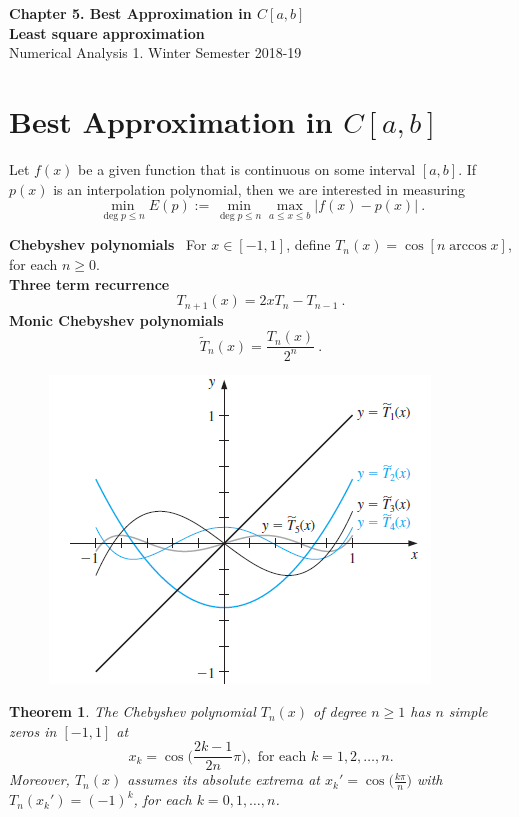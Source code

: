 \documentclass[12pt]{article}
\newtheorem{thm}{Theorem}
\theoremstyle{theorem}
\begin{document}

\thispagestyle{empty}

\begin{center}
	{\LARGE \bf Chapter 5. Best Approximation in $C[a,b]$ \\ Least square approximation}\\[.2cm]
	{\large Numerical Analysis 1. Winter Semester 2018-19}
\end{center}

\section{Best Approximation in $C[a,b]$}

Let $f(x)$ be a given function that is continuous on some interval $[a,b]$. If $p(x)$ is an interpolation polynomial, then we are interested in measuring 
%
\[  
\min_{\deg p\leq n} E(p) := \min_{\deg p\leq n} \max_{a\leq x\leq b} |f(x)-p(x)| \ .
\]
%
\begin{shaded}
\textbf{Chebyshev polynomials} \ For $x \in [-1,1]$, define $T_n(x) = \cos[n \arccos x]$, for each $n \geq 0$. \\
\textbf{Three term recurrence}
\[ T_{n+1}(x) = 2x T_{n} - T_{n-1} \ . \]
\textbf{Monic Chebyshev polynomials} 
\[ \tilde{T}_n(x) =  \dfrac{T_n(x)}{2^n} \ .\]
\end{shaded}

\begin{figure}[h!]
	\centering
	\includegraphics[scale = 0.9]{Figures/30}
\end{figure}

\begin{thm}
The Chebyshev polynomial $T_n(x)$ of degree $n \geq 1$ has $n$ simple zeros in $[-1, 1]$ at
%
\[ x_k = \cos \big( \frac{2k-1}{2n} \pi \big), \mbox{ for each } k = 1, 2, \dots , n. \]
%
Moreover, $T_n(x)$ assumes its absolute extrema at $x_k'=\cos \big(\frac{k\pi}{n}\big)$ with $T_n(x_k') = (-1)^k$, for each $k = 0, 1,\dots,n$.\\
\end{thm}
\end{document}
